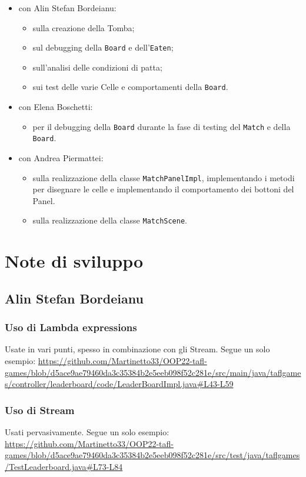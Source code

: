\documentclass[a4paper,12pt]{report}
\begin{document}
\begin{itemize}
	\item con  Alin Stefan Bordeianu:
		\begin{itemize}
			\item sulla creazione della Tomba;
			\item sul debugging della \texttt{Board} e dell'\texttt{Eaten};
			\item sull'analisi delle condizioni di patta;
			\item sui test delle varie Celle e comportamenti della \texttt{Board}.
		\end{itemize}
	\item con Elena Boschetti:
		\begin{itemize}
			\item per il debugging della \texttt{Board} durante la fase di testing del \texttt{Match} e della \texttt{Board}.
		\end{itemize}
	\item con Andrea Piermattei:
		\begin{itemize}
			\item sulla realizzazione della classe \texttt{MatchPanelImpl}, implementando i metodi per disegnare le celle e implementando il comportamento dei bottoni del Panel.
			\item sulla realizzazione della classe \texttt{MatchScene}.
		\end{itemize}
\end{itemize}

\section{Note di sviluppo}

\subsection{Alin Stefan Bordeianu}

\subsubsection{Uso di Lambda expressions}
Usate in vari punti, spesso in combinazione con gli Stream. Segue un solo esempio: \url{https://github.com/Martinetto33/OOP22-tafl-games/blob/d5ace9ae79460da3c35384b2e5eeb098f52c281e/src/main/java/taflgames/controller/leaderboard/code/LeaderBoardImpl.java#L43-L59}

\subsubsection{Uso di Stream}
Usati pervasivamente. Segue un solo esempio: \url{https://github.com/Martinetto33/OOP22-tafl-games/blob/d5ace9ae79460da3c35384b2e5eeb098f52c281e/src/test/java/taflgames/TestLeaderboard.java#L73-L84}
\end{document}
